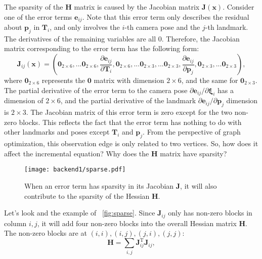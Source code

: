 The sparsity of the $\mathbf{H}$ matrix is caused by the Jacobian matrix $\mathbf{J}(\mathbf{x})$. Consider one of the error terms $\mathbf{e}_{ij}$. Note that this error term only describes the residual about $\mathbf{p}_j$ in $\mathbf{T}_i$, and only involves the $i$-th camera pose and the $j$-th landmark. The derivatives of the remaining variables are all 0. Therefore, the Jacobian matrix corresponding to the error term has the following form:
\begin{equation}
	\mathbf{J}_{ij}(\mathbf{x}) = \left(
	\mathbf{0}_{2 \times 6},...
	\mathbf{0}_{2 \times 6},
	\frac{\partial \mathbf{e}_{ij}}{\partial \mathbf{T}_i},
	\mathbf{0}_{2 \times 6},...
	\mathbf{0}_{2 \times 3},...
	\mathbf{0}_{2 \times 3},
	\frac{\partial \mathbf{e}_{ij}}{ \partial \mathbf{p}_j},
	\mathbf{0}_{2 \times 3},...
	\mathbf{0}_{2 \times 3} 
	\right) ,
\end{equation}
where $\mathbf{0}_{2 \times 6}$ represents the $\mathbf{0}$ matrix with dimension $2 \times 6$, and the same for $\mathbf{0}_{2 \times 3}$. The partial derivative of the error term to the camera pose ${\partial \mathbf{e}_{ij}}/{\partial \mathbf{\xi}_i}$ has a dimension of $2 \times 6$, and the partial derivative of the landmark ${\partial \mathbf{e}_{ij}}/{\partial \mathbf{p}_j}$ dimension is $2 \times 3$. The Jacobian matrix of this error term is zero except for the two non-zero blocks. This reflects the fact that the error term has nothing to do with other landmarks and poses except $\mathbf{T}_i$ and $\mathbf{p}_j$. From the perspective of graph optimization, this observation edge is only related to two vertices. So, how does it affect the incremental equation? Why does the $\mathbf{H}$ matrix have sparsity?

\begin{figure}[!htp]
	\centering
	\texttt{[image: backend1/sparse.pdf]}
	\caption{When an error term has sparsity in its Jacobian $\mathbf{J}$, it will also contribute to the sparsity of the Hessian $\mathbf{H}$.}
	\label{fig:sparse}
\end{figure}

Let's look and the example of ~\autoref{fig:sparse}. Since $\mathbf{J}_{ij}$ only has non-zero blocks in column $i, j$, it will add four non-zero blocks into the overall Hessian matrix $\mathbf{H}$. The non-zero blocks are at $(i,i), (i,j), (j,i), (j,j)$: 
\begin{equation}
	\mathbf{H} = \sum_{i,j} \mathbf{J}_{ij}^\mathrm{T} \mathbf{J}_{ij},
\end{equation}

